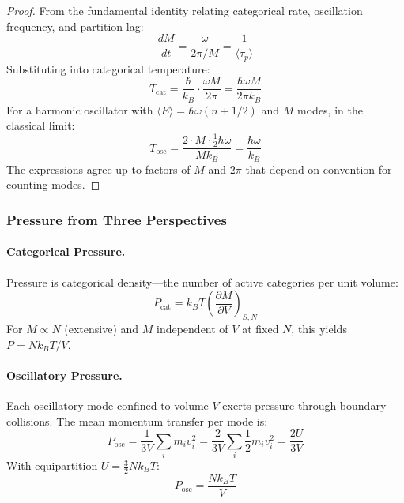 \begin{proof}
From the fundamental identity relating categorical rate, oscillation frequency, and partition lag:
\begin{equation}
\frac{dM}{dt} = \frac{\omega}{2\pi/M} = \frac{1}{\langle\tau_p\rangle}
\end{equation}
Substituting into categorical temperature:
\begin{equation}
T_{\text{cat}} = \frac{\hbar}{k_B} \cdot \frac{\omega M}{2\pi} = \frac{\hbar \omega M}{2\pi k_B}
\end{equation}
For a harmonic oscillator with $\langle E \rangle = \hbar\omega(n + 1/2)$ and $M$ modes, in the classical limit:
\begin{equation}
T_{\text{osc}} = \frac{2 \cdot M \cdot \frac{1}{2}\hbar\omega}{M k_B} = \frac{\hbar\omega}{k_B}
\end{equation}
The expressions agree up to factors of $M$ and $2\pi$ that depend on convention for counting modes.
\end{proof}

\subsubsection{Pressure from Three Perspectives}

\paragraph{Categorical Pressure.}
Pressure is categorical density---the number of active categories per unit volume:
\begin{equation}
P_{\text{cat}} = k_B T \left(\frac{\partial M}{\partial V}\right)_{S,N}
\label{eq:categorical_pressure}
\end{equation}
For $M \propto N$ (extensive) and $M$ independent of $V$ at fixed $N$, this yields $P = Nk_BT/V$.

\paragraph{Oscillatory Pressure.}
Each oscillatory mode confined to volume $V$ exerts pressure through boundary collisions. The mean momentum transfer per mode is:
\begin{equation}
P_{\text{osc}} = \frac{1}{3V} \sum_i m_i v_i^2 = \frac{2}{3V} \sum_i \frac{1}{2}m_i v_i^2 = \frac{2U}{3V}
\label{eq:oscillatory_pressure}
\end{equation}
With equipartition $U = \frac{3}{2}Nk_BT$:
\begin{equation}
P_{\text{osc}} = \frac{Nk_BT}{V}
\end{equation}

